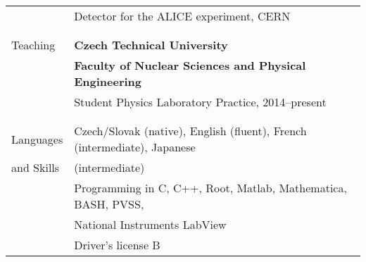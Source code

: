 \documentclass[a4paper,11pt,oneside]{article}
\begin{document}
\begin{tabular}{@{} l l}
     & Detector for the ALICE experiment, CERN \\
     \\
     \\
  \Large{Teaching}  & \textbf{Czech Technical University} \\
     & \textbf{Faculty of Nuclear Sciences and Physical Engineering} \\
     & Student Physics Laboratory Practice, 2014--present\\
     & \\
     \\
  \Large{Languages}   & Czech/Slovak (native), English (fluent), French (intermediate), Japanese \\
\Large{and Skills}    & (intermediate)  \\[.2cm]
     & Programming in C, C++, Root, Matlab, Mathematica, BASH, PVSS, \\
     &  National Instruments LabView \\[.2cm]
     & Driver's license B
\end{tabular}

\newpage
\end{document}
